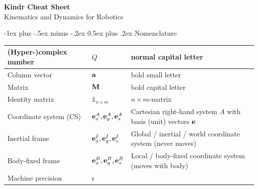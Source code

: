 \documentclass[10pt,landscape,a4paper]{article}
\makeatletter
\renewcommand{\section}{\@startsection{section}{1}{0mm}%
                                {-1ex plus -.5ex minus -.2ex}%
                                {0.5ex plus .2ex}%
                                {\normalfont\large\bfseries}}
\newcommand\identity{\mathds{1}}
\newcommand\linvel[2]{{}_#1\vv_{#2}}
\newcommand\rotvel[3]{{}_#1\vom_{#2\!#3}}
\makeatother
\begin{document}
\raggedright
\footnotesize
\begin{multicols}{2}


\setlength{\premulticols}{1pt}
\setlength{\postmulticols}{1pt}
\setlength{\multicolsep}{1pt}
\setlength{\columnsep}{2pt}

\begin{center}
     \Large{\textbf{Kindr Cheat Sheet}} \\
      \small{Kinematics and Dynamics for Robotics}
\end{center}
\section{Nomenclature }
\begin{tabular}{|l|l@{}|l|}
\hline
(Hyper-)complex number & $Q$ & normal capital letter  \\ \hline
Column vector & $\mathbf a$ & bold small letter  \\ \hline
Matrix & $\mathbf M$ & bold capital letter  \\ \hline
Identity matrix & $\identity_{n\times m}$ & ${n \times m}$-matrix  \\  \hline
Coordinate system (CS) & ${\mathbf e_x^A,\mathbf e_y^A,\mathbf e_z^A}$ & Cartesian right-hand system $A$ with basis (unit) vectors $\mathbf e$  \\ \hline
Inertial frame & ${\mathbf e_x^I,\mathbf e_y^I,\mathbf e_z^I}$ & Global / inertial / world coordinate system (never moves) \\ \hline
Body-fixed frame & ${\mathbf e_x^B,\mathbf e_y^B,\mathbf e_z^B}$ & Local / body-fixed coordinate system (moves with body) \\ \hline
Machine precision & $\epsilon$ & \\ \hline


\end{tabular}
\end{multicols}
\end{document}
